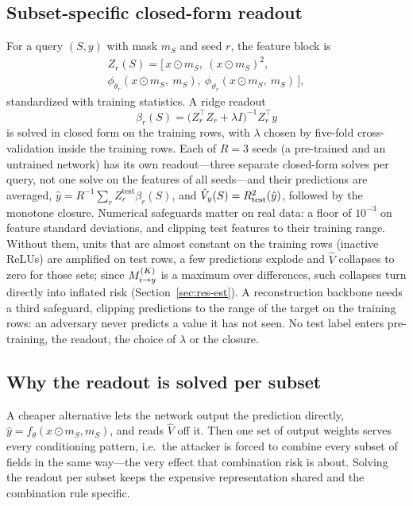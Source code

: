 \subsection{Subset-specific closed-form readout}
For a query $(S,y)$ with mask $m_S$ and seed $r$, the feature block is
\begin{multline}
Z_{r}(S) = \big[\, x\odot m_S,\ (x \odot m_S)^{2},\\ \phi_{\theta_r}(x\odot m_S,\ m_S),\ \phi_{\vartheta_r}(x\odot m_S,\ m_S) \,\big],
\end{multline}
standardized with training statistics. A ridge readout
\begin{equation}\label{eq:ridge}
\beta_{r}(S) = \big(Z_r^{\top} Z_r + \lambda I\big)^{-1} Z_r^{\top} y
\end{equation}
is solved in closed form on the training rows, with $\lambda$ chosen by five-fold
cross-validation inside the training rows. Each of $R=3$ seeds (a pre-trained and an untrained network) has its own
readout---three separate closed-form solves per query, not one solve on the features of all seeds---and their
predictions are averaged, $\hat y = R^{-1}\sum_r Z_r^{\mathrm{test}}\beta_r(S)$, and
$\hat V_y(S)=R^{2}_{\mathrm{test}}(\hat y)$, followed by the monotone closure. Numerical
safeguards matter on real data: a floor of $10^{-3}$ on feature standard deviations, and
clipping test features to their training range. Without them, units that are almost constant
on the training rows (inactive ReLUs) are amplified on test rows, a few predictions explode and
$\hat V$ collapses to zero for those sets; since $M^{(K)}_{i \to y}$ is a maximum over differences, such
collapses turn directly into inflated risk (Section~\ref{sec:res-est}). A reconstruction backbone
needs a third safeguard, clipping predictions to the range of the target on the training rows: an adversary never
predicts a value it has not seen. No test label enters
pre-training, the readout, the choice of $\lambda$ or the closure.

\subsection{Why the readout is solved per subset}
A cheaper alternative lets the network output the prediction directly, $\hat y=f_\theta(x\odot
m_S, m_S)$, and reads $\hat V$ off it. Then one set of output weights serves every
conditioning pattern, i.e.\ the attacker is forced to combine every subset of fields in the
same way---the very effect that combination risk is about. Solving the readout per subset
keeps the expensive representation shared and the combination rule specific.

